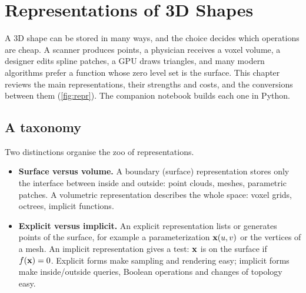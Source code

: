 \chapter{Representations of 3D Shapes}\label{ch:repr}

A 3D shape can be stored in many ways, and the choice decides which operations are cheap. A
scanner produces points, a physician receives a voxel volume, a designer edits spline patches, a
GPU draws triangles, and many modern algorithms prefer a function whose zero level set is the
surface. This chapter reviews the main representations, their strengths and costs, and the
conversions between them (\cref{fig:repr}). The companion notebook builds each one in Python.


\section{A taxonomy}

Two distinctions organise the zoo of representations.
\begin{itemize}
  \item \textbf{Surface versus volume.} A boundary (surface) representation stores only the
  interface between inside and outside: point clouds, meshes, parametric patches. A volumetric
  representation describes the whole space: voxel grids, octrees, implicit functions.
  \item \textbf{Explicit versus implicit.} An explicit representation lists or generates points of
  the surface, for example a parameterization $\mathbf{x}(u,v)$ or the vertices of a mesh. An implicit
  representation gives a test: $\mathbf{x}$ is on the surface if $f(\mathbf{x})=0$. Explicit forms make sampling
  and rendering easy; implicit forms make inside/outside queries, Boolean operations and changes of
  topology easy.
\end{itemize}

